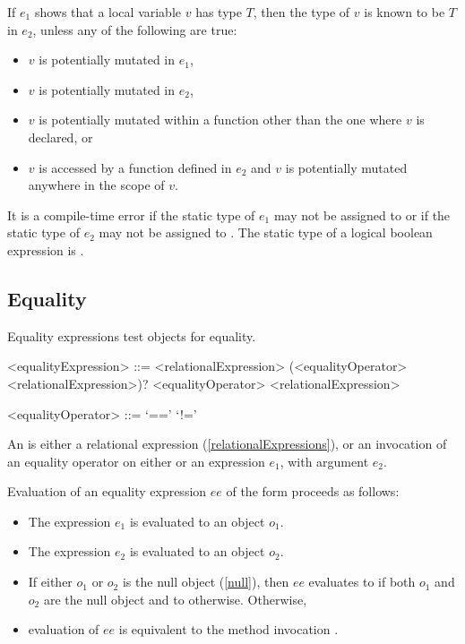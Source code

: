 \documentclass[makeidx]{article}
\begin{document}
{\LMHash{}%
If $e_1$ shows that a local variable $v$ has type $T$,
then the type of $v$ is known to be $T$ in $e_2$,
unless any of the following are true:
\begin{itemize}
\item $v$ is potentially mutated in $e_1$,
\item $v$ is potentially mutated in $e_2$,
\item $v$ is potentially mutated within a function other
than the one where $v$ is declared, or
\item $v$ is accessed by a function defined in $e_2$ and
$v$ is potentially mutated anywhere in the scope of $v$.
\end{itemize}

\LMHash{}%
It is a compile-time error if the static type of $e_1$ may not be assigned to  or if the static type of $e_2$ may not be assigned to .
The static type of a logical boolean expression is .


\subsection{Equality}

\LMHash{}%
Equality expressions test objects for equality.

\begin{grammar}
<equalityExpression> ::= \gnewline{}
  <relationalExpression> (<equalityOperator> <relationalExpression>)?
  \alt \SUPER{} <equalityOperator> <relationalExpression>

<equalityOperator> ::= `=='
  \alt `!='
\end{grammar}

\LMHash{}%
An  is either a relational expression (\ref{relationalExpressions}), or an invocation of an equality operator on either \SUPER{} or an expression $e_1$, with argument $e_2$.

\LMHash{}%
Evaluation of an equality expression $ee$ of the form  proceeds as follows:
\begin{itemize}
\item The expression $e_1$ is evaluated to an object $o_1$.
\item The expression $e_2$ is evaluated to an object $o_2$.
\item If either $o_1$ or $o_2$ is the null object (\ref{null}), then $ee$ evaluates to \TRUE{} if both $o_1$ and $o_2$ are the null object and to \FALSE{} otherwise.
Otherwise,
\item evaluation of $ee$ is equivalent to the method invocation .
\end{itemize}

}
\end{document}
